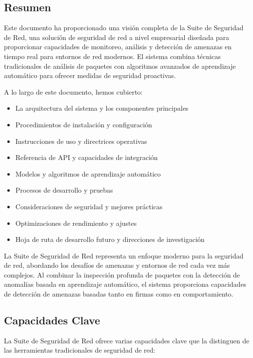 \subsection{Resumen}
Este documento ha proporcionado una visión completa de la Suite de Seguridad de Red, una solución de seguridad de red a nivel empresarial diseñada para proporcionar capacidades de monitoreo, análisis y detección de amenazas en tiempo real para entornos de red modernos. El sistema combina técnicas tradicionales de análisis de paquetes con algoritmos avanzados de aprendizaje automático para ofrecer medidas de seguridad proactivas.

A lo largo de este documento, hemos cubierto:

\begin{itemize}
    \item La arquitectura del sistema y los componentes principales
    \item Procedimientos de instalación y configuración
    \item Instrucciones de uso y directrices operativas
    \item Referencia de API y capacidades de integración
    \item Modelos y algoritmos de aprendizaje automático
    \item Procesos de desarrollo y pruebas
    \item Consideraciones de seguridad y mejores prácticas
    \item Optimizaciones de rendimiento y ajustes
    \item Hoja de ruta de desarrollo futuro y direcciones de investigación
\end{itemize}

La Suite de Seguridad de Red representa un enfoque moderno para la seguridad de red, abordando los desafíos de amenazas y entornos de red cada vez más complejos. Al combinar la inspección profunda de paquetes con la detección de anomalías basada en aprendizaje automático, el sistema proporciona capacidades de detección de amenazas basadas tanto en firmas como en comportamiento.

\subsection{Capacidades Clave}
La Suite de Seguridad de Red ofrece varias capacidades clave que la distinguen de las herramientas tradicionales de seguridad de red:

